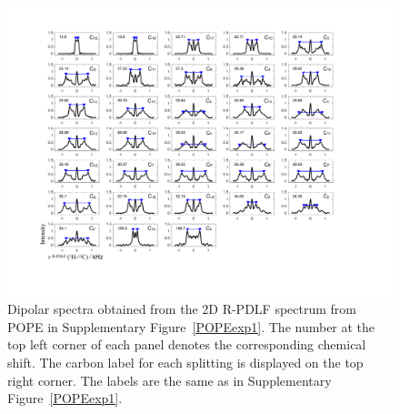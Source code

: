 \documentclass[fleqn,10pt]{wlscirepSI}
\begin{document}
\begin{figure}[p]
  \includegraphics[width=\textwidth]{Figures/POPE_slices.pdf}
  \caption{Dipolar spectra obtained from the 2D R-PDLF spectrum from POPE in Supplementary Figure~\ref{POPEexp1}. The number at the top left corner of each panel denotes the corresponding chemical shift. The carbon label for each splitting is displayed on the top right corner. The labels are the same as in Supplementary Figure~\ref{POPEexp1}.  }
  \label{POPEexp2}
\end{figure}
\end{document}
